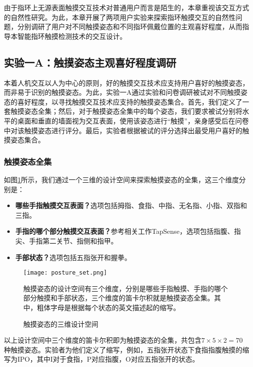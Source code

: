 由于指环上无源表面触摸交互技术对普通用户而言是陌生的，本章重视该交互方式的自然性研究。为此，本章开展了两项用户实验来探索指环触摸交互的自然性问题，分别调研了用户对不同触摸姿态和不同指环佩戴位置的主观喜好程度，从而指导本智能指环触摸检测技术的交互设计。

\subsection{实验一A：触摸姿态主观喜好程度调研}

本着人机交互以人为中心的原则，好的触摸交互技术应支持用户喜好的触摸姿态，而非易于识别的触摸姿态。为此，实验一A通过实验和问卷调研被试对不同触摸姿态的喜好程度，以寻找触摸交互技术应支持的触摸姿态集合。首先，我们定义了一套触摸姿态全集；然后，对于触摸姿态全集中的每个姿态，我们要求被试分别将水平的桌面和垂直的墙面视为交互表面，使用该姿态进行“触摸”，亲身感受后在问卷中对该触摸姿态进行评分。最后，实验者根据被试的评分选择出最受用户喜好的触摸姿态集合。

\subsubsection{触摸姿态全集}

如图\ref{fig:posture_set}所示，我们通过一个三维的设计空间来探索触摸姿态的全集，这三个维度分别是：

\begin{itemize}
\item \textbf{哪些手指触摸交互表面？}选项包括拇指、食指、中指、无名指、小指、双指和三指。
\item \textbf{手指的哪个部分触摸交互表面？}参考相关工作TapSense\cite{harrison2011tapsense}，选项包括指腹、指尖、手指第二关节、指侧和指甲。
\item \textbf{手部状态？}选项包括五指张开和握拳。
\end{itemize}

\begin{figure}
	\centering
	\texttt{[image: posture\_set.png]}
	\caption*{触摸姿态的设计空间有三个维度，分别是哪些手指触摸、手指的哪个部分触摸和手部状态，三个维度的笛卡尔积就是触摸姿态全集。其中，粗体字母是根据每个状态的英文描述起的缩写。}
	\caption{触摸姿态的三维设计空间}
	\label{fig:posture_set}
\end{figure}

以上设计空间中三个维度的笛卡尔积即为触摸姿态的全集，共包含$7\times5\times2=70$种触摸姿态。实验者为他们定义了缩写，例如，五指张开状态下食指指腹触摸的缩写为IPO，其中I对于食指，P对应指腹，O对应五指张开的状态。

